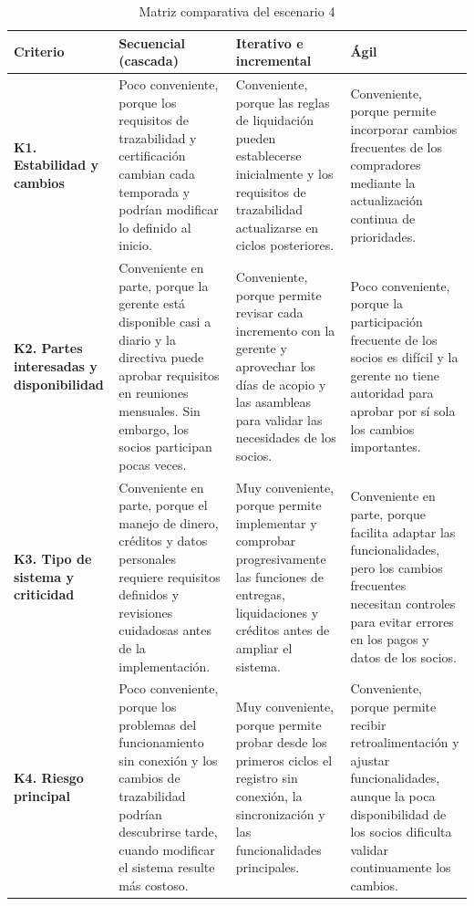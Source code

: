 \documentclass[12pt,a4paper]{article}
\renewcommand{\arraystretch}{1.3}
\begin{document}
\begin{table}[H]
\centering
\caption{Matriz comparativa del escenario 4}
\label{tab:matriz_escenario4}
\footnotesize
\renewcommand{\arraystretch}{1.05}
\setlength{\tabcolsep}{3pt}
\begin{tabularx}{\textwidth}{
    >{\raggedright\arraybackslash}p{2.35cm} Y Y Y
}
\toprule
\textbf{Criterio} &
\textbf{Secuencial (cascada)} &
\textbf{Iterativo e incremental} &
\textbf{Ágil} \\
\midrule

\textbf{K1. Estabilidad y cambios}
&
Poco conveniente, porque los requisitos de trazabilidad y certificación cambian cada temporada y podrían modificar lo definido al inicio.
&
Conveniente, porque las reglas de liquidación pueden establecerse inicialmente y los requisitos de trazabilidad actualizarse en ciclos posteriores.
&
Conveniente, porque permite incorporar cambios frecuentes de los compradores mediante la actualización continua de prioridades.
\\
\midrule

\textbf{K2. Partes interesadas y disponibilidad}
&
Conveniente en parte, porque la gerente está disponible casi a diario y la directiva puede aprobar requisitos en reuniones mensuales. Sin embargo, los socios participan pocas veces.
&
Conveniente, porque permite revisar cada incremento con la gerente y aprovechar los días de acopio y las asambleas para validar las necesidades de los socios.
&
Poco conveniente, porque la participación frecuente de los socios es difícil y la gerente no tiene autoridad para aprobar por sí sola los cambios importantes.
\\
\midrule

\textbf{K3. Tipo de sistema y criticidad}
&
Conveniente en parte, porque el manejo de dinero, créditos y datos personales requiere requisitos definidos y revisiones cuidadosas antes de la implementación.
&
Muy conveniente, porque permite implementar y comprobar progresivamente las funciones de entregas, liquidaciones y créditos antes de ampliar el sistema.
&
Conveniente en parte, porque facilita adaptar las funcionalidades, pero los cambios frecuentes necesitan controles para evitar errores en los pagos y datos de los socios.
\\
\midrule

\textbf{K4. Riesgo principal}
&
Poco conveniente, porque los problemas del funcionamiento sin conexión y los cambios de trazabilidad podrían descubrirse tarde, cuando modificar el sistema resulte más costoso.
&
Muy conveniente, porque permite probar desde los primeros ciclos el registro sin conexión, la sincronización y las funcionalidades principales.
&
Conveniente, porque permite recibir retroalimentación y ajustar funcionalidades, aunque la poca disponibilidad de los socios dificulta validar continuamente los cambios.
\\
\midrule


\end{tabularx}
\end{table}
\end{document}
